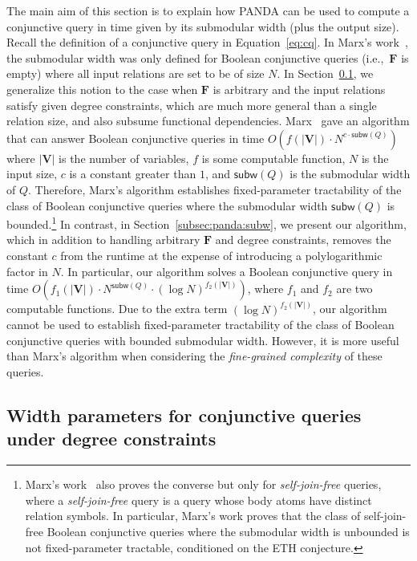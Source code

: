 \documentclass[10pt,a4paper]{article}
\newcommand{\panda}{\textsf{PANDA}\xspace}
\newcommand{\subm}{\textsf{subw}}
\begin{document}
The main aim of this section is to explain how \panda can be used to compute a conjunctive
query in time given by its submodular width (plus the output size). Recall the definition of
a conjunctive query in Equation~\eqref{eq:cq}.
In Marx's work~\cite{DBLP:journals/jacm/Marx13}, the submodular width was only defined for Boolean
conjunctive queries (i.e.,~$\bm F$ is empty) where all input relations are set to be of size
$N$. In Section~\ref{subsec:width:parameters}, we generalize this notion to the case when $\bm F$ is arbitrary and the
input relations satisfy given degree constraints, which are much more general than a single relation
size, and also subsume functional dependencies.
Marx~\cite{DBLP:journals/jacm/Marx13} gave an algorithm that can answer Boolean conjunctive queries in time
$O(f(|\bm V|)\cdot N^{c\cdot\subm(Q)})$ where $|\bm V|$ is the number of variables, $f$ is some computable function, $N$ is the input size, $c$ is a constant greater than $1$, and $\subm(Q)$
is the submodular width of $Q$.
Therefore, Marx's algorithm establishes fixed-parameter tractability of the class of Boolean conjunctive queries
where the submodular width $\subm(Q)$ is bounded.\footnote{Marx's work~\cite{DBLP:journals/jacm/Marx13} also proves the converse but only for {\em self-join-free} queries,
where a {\em self-join-free} query is a query whose body atoms have distinct relation symbols.
In particular, Marx's work proves that the class of self-join-free Boolean conjunctive queries
where the submodular width is unbounded is not fixed-parameter tractable, conditioned on the ETH conjecture.}
In contrast, in Section~\ref{subsec:panda:subw}, we present our algorithm, which in addition to handling arbitrary $\bm F$ and degree constraints, removes the constant $c$ from the runtime
at the expense of introducing a polylogarithmic factor in $N$.
In particular, our algorithm solves a Boolean conjunctive query in time
$O(f_1(|\bm V|)\cdot N^{\subm(Q)}\cdot (\log N)^{f_2(|\bm V|)})$,
where $f_1$ and $f_2$ are two computable functions.
Due to the extra term $(\log N)^{f_2(|\bm V|)}$, our algorithm cannot be used to establish
fixed-parameter tractability of the class of Boolean conjunctive queries with bounded submodular width.
However, it is more useful than Marx's algorithm when considering the {\em fine-grained complexity} of these queries.

\subsection{Width parameters for conjunctive queries under degree constraints}
\label{subsec:width:parameters}
\end{document}
